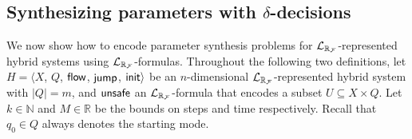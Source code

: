 %




\subsection{Synthesizing parameters with $\delta$-decisions}

We now show how to encode parameter synthesis problems for $\mathcal{L}_{\mathbb{R}_{\mathcal{F}}}$-represented hybrid systems using $\mathcal{L}_{\mathbb{R}_{\mathcal{F}}}$-formulas. %
Throughout the following two definitions, let $H = \langle X$, $Q$, $\mathsf{flow}$, $\mathsf{jump}$, $\mathsf{init}\rangle$ be an $n$-dimensional $\mathcal{L}_{\mathbb{R}_{\mathcal{F}}}$-represented hybrid system with $|Q|=m$, and $\mathsf{unsafe}$ an $\mathcal{L}_{\mathbb{R}_{\mathcal{F}}}$-formula that encodes a subset $U\subseteq X\times Q$. Let $k\in \mathbb{N}$ and $M\in \mathbb{R}$ be the bounds on steps and time respectively. Recall that $q_0\in Q$ always denotes the starting mode.

